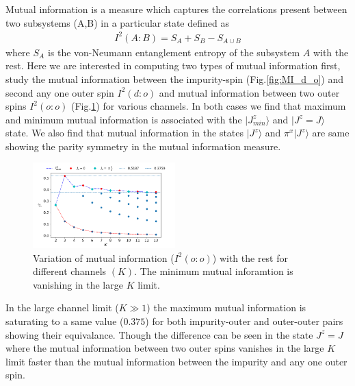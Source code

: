 \documentclass[reprint,prb,superscriptaddress]{revtex4-2}
\begin{document}
\noindent  Mutual information is a measure which captures the correlations present between two subsystems (A,B) in a particular state defined as
\begin{eqnarray}
I^2(A:B)=S_A+S_B-S_{A\cup B}
\end{eqnarray}
where $S_{A}$ is the von-Neumann entanglement entropy of the subsystem $A$ with the rest. Here we are interested in computing two types of mutual information first, study the mutual information between the impurity-spin (Fig.\ref{fig:MI_d_o}) and second any one outer spin $I^2(d:o)$ and mutual information between two outer spins $I^2(o:o)$ (Fig.\ref{fig:MI_o_o}) for various channels. In both cases we find that maximum and minimum mutual information is associated with the $|J^z_{min}\rangle$ and $|J^z=J\rangle$ state. We also find that mutual information in the states $|J^z\rangle$ and $\pi^x|J^z\rangle$ are same showing the parity symmetry in the mutual information measure.
\begin{figure}[!htpb]
\includegraphics[width=0.49\textwidth]{plt/NEW31Dec_I_2_vs_Nch_[1,2]}
\caption{Variation of mutual information ($I^2(o:o)$) with the rest for different channels $(K)$. The minimum mutual inforamtion is vanishing in the large $K$ limit.}
\label{fig:MI_o_o}
\end{figure}
%
%
\noindent In the large channel limit ($K\gg 1$) the maximum mutual information is saturating to a same value ($0.375$) for both impurity-outer and outer-outer pairs showing their equivalance. Though the difference can be seen in the state $J^z=J$ where the mutual information between two outer spins vanishes in the large $K$ limit faster than the mutual information between the impurity and any one outer spin. 
\end{document}
